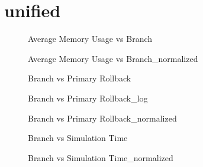 \section{unified}
\begin{figure}[H]
\centering

\caption{Average Memory Usage vs Branch}
\end{figure}
\vspace{1cm}
\begin{figure}[H]
\centering

\caption{Average Memory Usage vs Branch\_normalized}
\end{figure}
\vspace{1cm}
\newpage
\begin{figure}[H]
\centering

\caption{Branch vs Primary Rollback}
\end{figure}
\vspace{1cm}
\begin{figure}[H]
\centering

\caption{Branch vs Primary Rollback\_log}
\end{figure}
\vspace{1cm}
\newpage
\begin{figure}[H]
\centering

\caption{Branch vs Primary Rollback\_normalized}
\end{figure}
\vspace{1cm}
\begin{figure}[H]
\centering

\caption{Branch vs Simulation Time}
\end{figure}
\vspace{1cm}
\newpage
\begin{figure}[H]
\centering

\caption{Branch vs Simulation Time\_normalized}
\end{figure}
